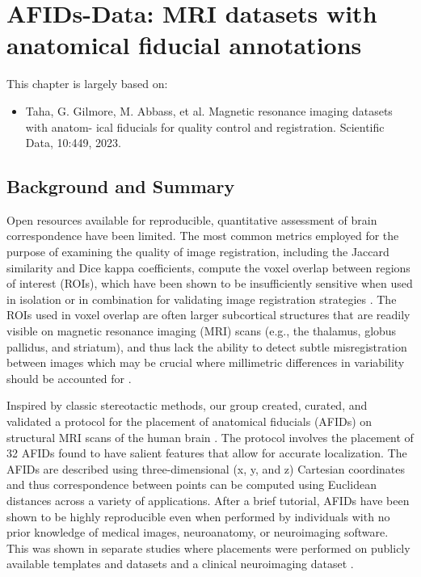 \chapter{AFIDs-Data: MRI datasets with anatomical fiducial annotations}\label{chap:afidsdata}
\newpage
\sloppy
\noindent This chapter is largely based on:
\begin{itemize}[noitemsep,topsep=0pt]
	\item Taha, G. Gilmore, M. Abbass, et al. Magnetic resonance imaging datasets with anatom-
ical fiducials for quality control and registration. Scientific Data, 10:449, 2023.
\end{itemize}
\section{Background and Summary}
Open resources available for reproducible, quantitative assessment of brain correspondence have been limited. The most common metrics employed for the purpose of examining the quality of image registration, including the Jaccard similarity and Dice kappa coefficients, compute the voxel overlap between regions of interest (ROIs), which have been shown to be insufficiently sensitive when used in isolation or in combination for validating image registration strategies \cite{Rohlfing2012-kt}. The ROIs used in voxel overlap are often larger subcortical structures that are readily visible on magnetic resonance imaging (MRI) scans (e.g., the thalamus, globus pallidus, and striatum), and thus lack the ability to detect subtle misregistration between images which may be crucial where millimetric differences in variability should be accounted for \cite{Rohlfing2012-kt,Lau2019-eh,Abbass2022-lf,Chakravarty2009-kq}.

Inspired by classic stereotactic methods, our group created, curated, and validated a protocol for the placement of anatomical fiducials (AFIDs) on structural MRI scans of the human brain \cite{Lau2019-eh}. The protocol involves the placement of 32 AFIDs found to have salient features that allow for accurate localization. The AFIDs are described using three-dimensional (x, y, and z) Cartesian coordinates and thus correspondence between points can be computed using Euclidean distances across a variety of applications. After a brief tutorial, AFIDs have been shown to be highly reproducible even when performed by individuals with no prior knowledge of medical images, neuroanatomy, or neuroimaging software. This was shown in separate studies where placements were performed on publicly available templates and datasets \cite{Lau2019-eh} and a clinical neuroimaging dataset \cite{Abbass2022-lf}.

